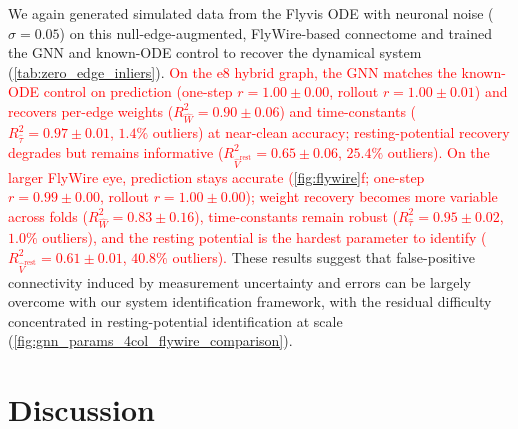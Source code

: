 \documentclass{article}
\begin{document}
We again generated simulated data from the Flyvis ODE with neuronal noise ($\sigma=0.05$) on this null-edge-augmented, FlyWire-based connectome and trained the GNN and known-ODE control to recover the dynamical system (\cref{tab:zero_edge_inliers}). \textcolor{red}{On the e8 hybrid graph, the GNN matches the known-ODE control on prediction (one-step $r = 1.00 \pm 0.00$, rollout $r = 1.00 \pm 0.01$) and recovers per-edge weights ($R^2_{\hat{W}} = 0.90 \pm 0.06$) and time-constants ($R^2_{\hat{\tau}} = 0.97 \pm 0.01$, $1.4\%$ outliers) at near-clean accuracy; resting-potential recovery degrades but remains informative ($R^2_{\hat{V}^{\mathrm{rest}}} = 0.65 \pm 0.06$, $25.4\%$ outliers).} \textcolor{red}{On the larger FlyWire eye, prediction stays accurate (\cref{fig:flywire}f; one-step $r = 0.99 \pm 0.00$, rollout $r = 1.00 \pm 0.00$); weight recovery becomes more variable across folds ($R^2_{\hat{W}} = 0.83 \pm 0.16$), time-constants remain robust ($R^2_{\hat{\tau}} = 0.95 \pm 0.02$, $1.0\%$ outliers), and the resting potential is the hardest parameter to identify ($R^2_{\hat{V}^{\mathrm{rest}}} = 0.61 \pm 0.01$, $40.8\%$ outliers).} These results suggest that false-positive connectivity induced by measurement uncertainty and errors can be largely overcome with our system identification framework, with the residual difficulty concentrated in resting-potential identification at scale (\cref{fig:gnn_params_4col_flywire_comparison}).


\section{Discussion}
\label{sec:limitations}
\end{document}
